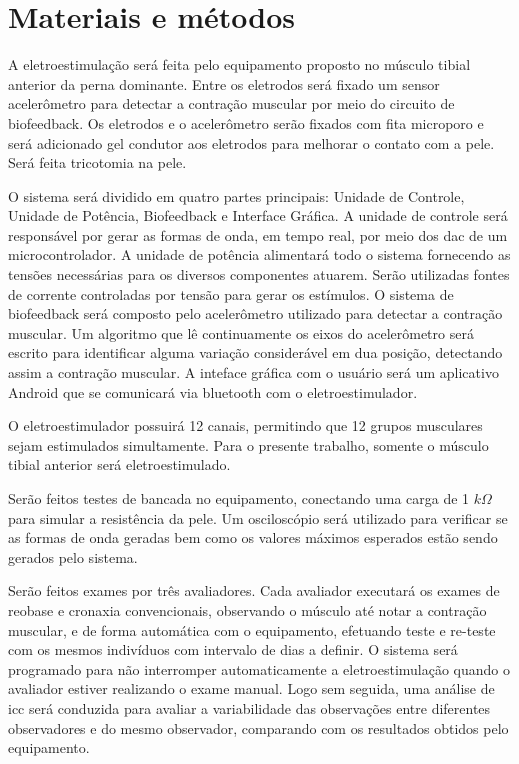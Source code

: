 \section{Materiais e métodos}

A eletroestimulação será feita pelo equipamento proposto no músculo tibial anterior da perna dominante. Entre os eletrodos será fixado um sensor acelerômetro para detectar a contração muscular por meio do circuito de biofeedback. Os eletrodos e o acelerômetro serão fixados com fita microporo e será adicionado gel condutor aos eletrodos para melhorar o contato com a pele. Será feita tricotomia na pele.

O sistema será dividido em quatro partes principais: Unidade de Controle, Unidade de Potência, Biofeedback e Interface Gráfica. A unidade de controle será responsável por gerar as formas de onda, em tempo real, por meio dos \ac{dac} de um microcontrolador. A unidade de potência alimentará todo o sistema fornecendo as tensões necessárias para os diversos componentes atuarem. Serão utilizadas fontes de corrente controladas por tensão para gerar os estímulos. O sistema de biofeedback será composto pelo acelerômetro utilizado para detectar a contração muscular. Um algoritmo que lê continuamente os eixos do acelerômetro será escrito para identificar alguma variação considerável em dua posição, detectando assim a contração muscular. A inteface gráfica com o usuário será um aplicativo Android que se comunicará via bluetooth com o eletroestimulador.

O eletroestimulador possuirá 12 canais, permitindo que 12 grupos musculares sejam estimulados simultamente. Para o presente trabalho, somente o músculo tibial anterior será eletroestimulado.

Serão feitos testes de bancada no equipamento, conectando uma carga de 1 $k\Omega$ para simular a resistência da pele. Um osciloscópio será utilizado para verificar se as formas de onda geradas bem como os valores máximos esperados estão sendo gerados pelo sistema.

Serão feitos exames por três avaliadores. Cada avaliador executará os exames de reobase e cronaxia convencionais, observando o músculo até notar a contração muscular, e de forma automática com o equipamento, efetuando teste e re-teste com os mesmos indivíduos com intervalo de dias a definir. O sistema será programado para não interromper automaticamente a eletroestimulação quando o avaliador estiver realizando o exame manual. Logo sem seguida, uma análise de \ac{icc} será conduzida para avaliar a variabilidade das observações entre diferentes observadores e do mesmo observador, comparando com os resultados obtidos pelo equipamento.

